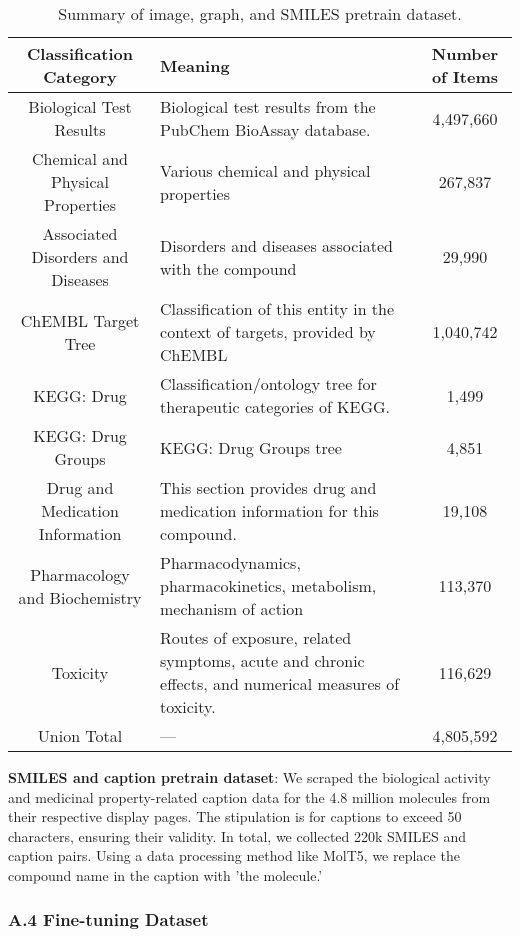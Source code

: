 \documentclass{article}
\begin{document}
\begin{table*}[ht]
\centering
\begin{tabular}{|c|p{}|c|}
\hline
\textbf{Classification Category} & \textbf{Meaning} & \textbf{Number of Items} \\
\hline
Biological Test Results & Biological test results from the PubChem BioAssay database. & 4,497,660 \\
\hline
Chemical and Physical Properties & Various chemical and physical properties & 267,837 \\
\hline
Associated Disorders and Diseases & Disorders and diseases associated with the compound & 29,990 \\
\hline
ChEMBL Target Tree & Classification of this entity in the context of targets, provided by ChEMBL & 1,040,742 \\
\hline
KEGG: Drug & Classification/ontology tree for therapeutic categories of KEGG. & 1,499 \\
\hline
KEGG: Drug Groups & KEGG: Drug Groups tree & 4,851 \\
\hline
Drug and Medication Information & This section provides drug and medication information for this compound. & 19,108 \\
\hline
Pharmacology and Biochemistry & Pharmacodynamics, pharmacokinetics, metabolism, mechanism of action & 113,370 \\
\hline
Toxicity & Routes of exposure, related symptoms, acute and chronic effects, and numerical measures of toxicity. & 116,629 \\
\hline
Union Total & --- & 4,805,592 \\
\hline
\end{tabular}
\caption{Summary of image, graph, and SMILES pretrain dataset.}
\label{tab:pretrain_image_dataset_summary}
\end{table*}

\textbf{SMILES and caption pretrain dataset}: We scraped the biological activity and medicinal property-related caption data for the 4.8 million molecules from their respective display pages. The stipulation is for captions to exceed 50 characters, ensuring their validity. In total, we collected 220k SMILES and caption pairs. Using a data processing method like MolT5, we replace the compound name in the caption with 'the molecule.'

\subsubsection*{A.4 Fine-tuning Dataset}
\end{document}
